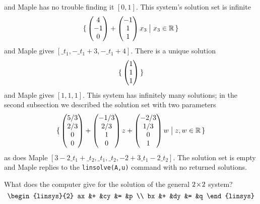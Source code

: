 \begin{exercises}
\begin{answer}
\begin{exparts}
\begin{equation*}
          \end{equation*}
          and Maple has no trouble finding it $[0,1]$.
        \partsitem This system's solution set is infinite
          \begin{equation*}
            \mbox{$\{\,\begin{pmatrix} 4 \\ -1 \\ 0 \end{pmatrix}+\begin{pmatrix} -1 \\ 1 \\ 1 \end{pmatrix}x_3
                             \bigm| x_3\in\mathbb{R}\,\}$}
          \end{equation*}
          and Maple gives $[\_t_1,-\_t_1+3,-\_t_1+4]$.
        \partsitem There is a unique solution
           \begin{equation*}
             \mbox{$\{\,\begin{pmatrix} 1 \\ 1 \\ 1 \end{pmatrix}\,\}$}
           \end{equation*}
           and Maple gives $[1,1,1]$.
        \partsitem This system has infinitely many solutions; in the 
           second subsection we described the solution set with
           two parameters
           \begin{equation*}
             \mbox{$\{\,\begin{pmatrix} 5/3 \\ 2/3 \\ 0 \\ 0 \end{pmatrix}
                  +\begin{pmatrix} -1/3 \\ 2/3 \\ 1 \\ 0 \end{pmatrix}z
                  +\begin{pmatrix} -2/3 \\ 1/3 \\ 0 \\ 1 \end{pmatrix}w
                  \bigm| z,w\in\mathbb{R}\,\}$}
           \end{equation*}
           as does Maple $[3-2\_t_1+\_t_2,\_t_1,\_t_2,-2+3\_t_1-2\_t_2]$.
        \partsitem The solution set is empty and Maple replies to the
           \texttt{linsolve(A,u)} command with no returned solutions.
      \end{exparts}
    \end{answer}
  \item 
    What does the computer give for the solution of the general
    $2 \! \times \! 2$  system?
    \begin{equation*}
      \begin{linsys}{2}
        ax  &+  &cy  &=  &p  \\
        bx  &+  &dy  &=  &q
      \end{linsys}
    \end{equation*}

\end{exercises}

